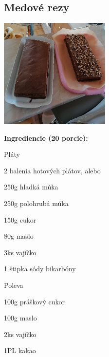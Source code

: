 \setcounter{step}{0}

\subsection{ Medové rezy }

\begin{ingredient}
  
      \includegraphics[height=5.5cm]{images/medove_rezy}
  
  \def\portions{  }
  \textbf{ {\normalsize Ingrediencie (20 porcie):} }

  \begin{main}
      \item 
  \end{main}
  
    \begin{subingredient}{Pláty}
        \item 2 balenia hotových plátov, alebo
        \item 250g hladká múka
        \item 250g polohrubá múka
        \item 150g cukor
        \item 80g maslo
        \item 3ks vajíčko
        \item 1 štipka sódy bikarbóny
    \end{subingredient}
  
    \begin{subingredient}{Poleva}
        \item 100g práškový cukor
        \item 100g maslo
        \item 2ks vajíčko
        \item 1PL kakao
    \end{subingredient}
  
\end{ingredient}
